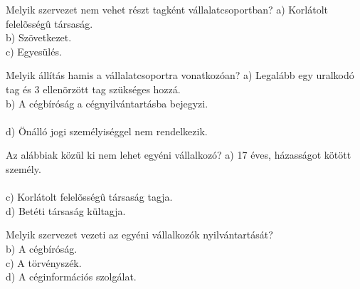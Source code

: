 \begin{frame}

\begin{tcolorbox}[title={83. Kérdés}]
Melyik szervezet nem vehet részt tagként vállalatcsoportban?
\tcblower
a) Korlátolt felelõsségû társaság.\\
b) Szövetkezet.\\
c) Egyesülés.\\
\end{tcolorbox}

\begin{tcolorbox}[title={84. Kérdés}]
Melyik állítás hamis a vállalatcsoportra vonatkozóan?
\tcblower
a) Legalább egy uralkodó tag és 3 ellenõrzött tag szükséges hozzá.\\
b) A cégbíróság a cégnyilvántartásba bejegyzi.\\
\\
d) Önálló jogi személyiséggel nem rendelkezik.
\end{tcolorbox}

\begin{tcolorbox}[title={85. Kérdés}]
Az alábbiak közül ki nem lehet egyéni vállalkozó?
\tcblower
a) 17 éves, házasságot kötött személy.\\
\\
c) Korlátolt felelõsségû társaság tagja.\\
d) Betéti társaság kültagja.
\end{tcolorbox}

\begin{tcolorbox}[title={86. Kérdés}]
Melyik szervezet vezeti az egyéni vállalkozók nyilvántartását?
\tcblower
{}\\
b) A cégbíróság.\\
c) A törvényszék.\\
d) A céginformációs szolgálat.
\end{tcolorbox}

\end{frame}



